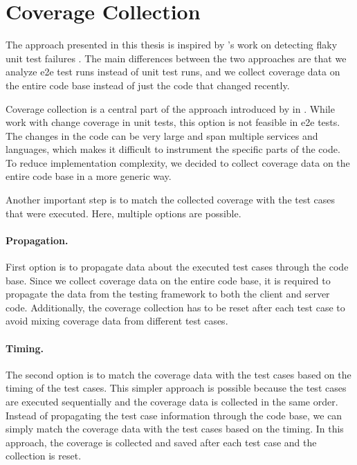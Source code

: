 \section{Coverage Collection}
The approach presented in this thesis is inspired by \citeauthor*{bell_deflaker_2018}'s work on detecting flaky unit test failures \autocite{bell_deflaker_2018}.
The main differences between the two approaches are that we analyze \ac{e2e} test runs instead of unit test runs, and we collect coverage data on the entire code base instead of just the code that changed recently.

Coverage collection is a central part of the approach introduced by \citeauthor*{bell_deflaker_2018} in  \autocite{bell_deflaker_2018}.
While \citeauthor*{bell_deflaker_2018} work with change coverage in unit tests, this option is not feasible in \ac{e2e} tests.
The changes in the code can be very large and span multiple services and languages, which makes it difficult to instrument the specific parts of the code.
To reduce implementation complexity, we decided to collect coverage data on the entire code base in a more generic way.

Another important step is to match the collected coverage with the test cases that were executed.
Here, multiple options are possible.

\paragraph{Propagation.} First option is to propagate data about the executed test cases through the code base.
Since we collect coverage data on the entire code base, it is required to propagate the data from the testing framework to both the client and server code.
Additionally, the coverage collection has to be reset after each test case to avoid mixing coverage data from different test cases.

\paragraph{Timing.} The second option is to match the coverage data with the test cases based on the timing of the test cases.
This simpler approach is possible because the test cases are executed sequentially and the coverage data is collected in the same order.
Instead of propagating the test case information through the code base, we can simply match the coverage data with the test cases based on the timing.
In this approach, the coverage is collected and saved after each test case and the collection is reset.

